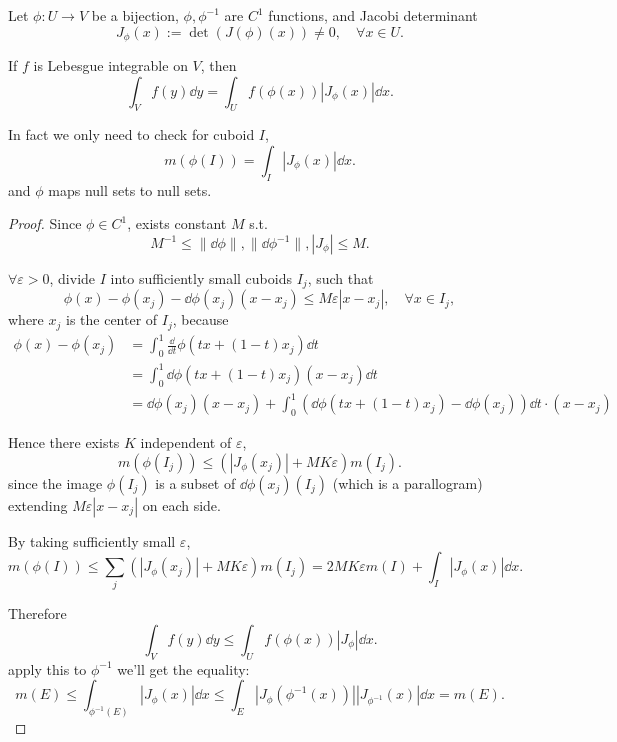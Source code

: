 \begin{theorem}
    Let $\phi: U\to V$ be a bijection, $\phi,\phi^{-1}$ are $C^1$ functions,
	and Jacobi determinant
	\[
		J_\phi(x) := \det(J(\phi)(x))\ne 0, \quad\forall x\in U.
	\]

	If $f$ is Lebesgue integrable on $V$, then
	\[
	\int_{V} f(y)\dd y = \int_U f(\phi(x)) |J_\phi(x)|\dd x.
	\]
\end{theorem}
\begin{remark}
    In fact we only need to check for cuboid $I$,
	\[
	m(\phi(I)) = \int_I |J_\phi(x)|\dd x.
	\]
	and $\phi$ maps null sets to null sets.
\end{remark}
\begin{proof}[Proof]
    Since $\phi\in C^1$, exists constant $M$ s.t.
	\[
	M^{-1}\le \lVert \dd \phi \rVert, \lVert \dd \phi^{-1} \rVert,
	|J_\phi|\le M.
	\]

	$\forall \varepsilon>0$, divide $I$ into sufficiently small cuboids $I_j$,
	such that
	\[
	\phi(x) - \phi(x_j) - \dd \phi(x_j)(x - x_j)\le M\varepsilon |x-x_j|,
	\quad \forall x\in I_j,
	\]
	where $x_j$ is the center of $I_j$, because
	\begin{align*}
		\phi(x) - \phi(x_j)
		&= \int_{0}^{1} \frac{\dd}{\dd t}\phi(tx + (1-t)x_j) \dd t\\
		&= \int_{0}^{1} \dd \phi (tx + (1-t)x_j) (x-x_j) \dd t\\
		&= \dd \phi(x_j) (x-x_j) + \int_{0}^{1}
		(\dd \phi (tx + (1-t)x_j) - \dd \phi(x_j))\dd t \cdot (x - x_j)
	\end{align*}

	Hence there exists $K$ independent of $\varepsilon$,
	\[
	m(\phi(I_j))\le (|J_\phi(x_j)| + MK\varepsilon) m(I_j).
	\]
	since the image $\phi(I_j)$ is a subset of $\dd \phi(x_j)(I_j)$
	(which is a parallogram) extending $M\varepsilon |x-x_j|$ on each side.

	By taking sufficiently small $\varepsilon$,
	\[
	m(\phi(I))\le \sum_{j} (|J_\phi(x_j)| + MK\varepsilon) m(I_j)
	= 2MK\varepsilon m(I) + \int_I |J_\phi(x)|\dd x.
	\]

	Therefore
	\[
	\int_V f(y)\dd y \le \int_U f(\phi(x))|J_\phi|\dd x.
	\]
	apply this to $\phi^{-1}$ we'll get the equality:
	\[
	m(E) \le \int_{\phi^{-1}(E)} |J_\phi(x)|\dd x
	\le \int_E |J_\phi(\phi^{-1}(x))||J_{\phi^{-1}}(x)|\dd x = m(E).
	\]
\end{proof}
